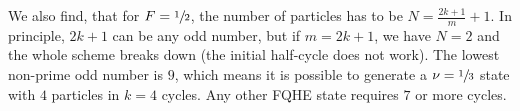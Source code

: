 We also find, that for $F=\sfrac{1}{2}$, the number of particles has to be $N=\frac{2k+1}{m}+1$. In principle, $2k+1$ can be any odd number, but if $m=2k+1$, we have $N=2$ and the whole scheme breaks down (the initial half-cycle does not work). The lowest non-prime odd number is $9$, which means it is possible to generate a $\nu=\sfrac{1}{3}$ state with $4$ particles in $k=4$ cycles. Any other FQHE state requires $7$ or more cycles.



